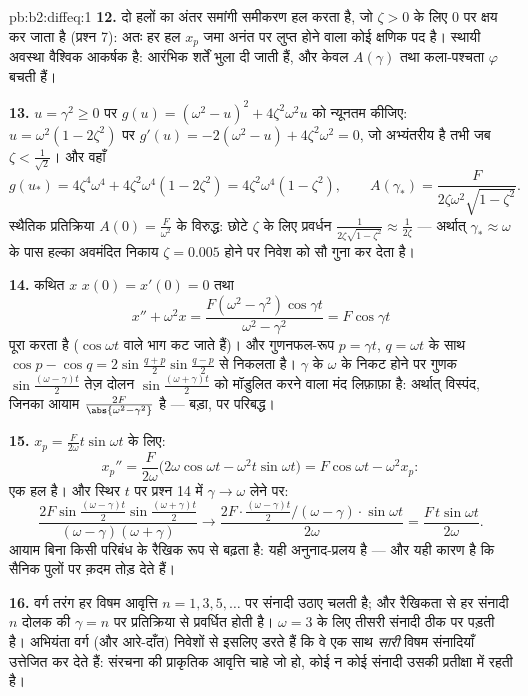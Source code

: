 \begin{solution}{pb:b2:diffeq:1}
\textbf{12.} दो हलों का अंतर समांगी समीकरण हल करता है, जो $\zeta > 0$ के लिए $0$
पर क्षय कर जाता है (प्रश्न 7): अतः हर हल $x_p$ जमा अनंत पर लुप्त होने वाला
कोई क्षणिक पद है। स्थायी अवस्था वैश्विक आकर्षक है: आरंभिक शर्तें भुला दी
जाती हैं, और केवल $A(\gamma)$ तथा कला-पश्चता $\varphi$ बचती हैं।

\textbf{13.} $u = \gamma^2 \geq 0$ पर $g(u) = (\omega^2 - u)^2 +
4\zeta^2\omega^2u$ को न्यूनतम कीजिए: $u = \omega^2(1 -
2\zeta^2)$ पर $g'(u) =
-2(\omega^2 - u) + 4\zeta^2\omega^2 = 0$, जो अभ्यंतरीय है तभी
जब $\zeta < \frac{1}{\sqrt2}$। और वहाँ
\[
g(u_*) = 4\zeta^4\omega^4 + 4\zeta^2\omega^4(1 - 2\zeta^2)
= 4\zeta^2\omega^4(1 - \zeta^2),
\qquad
A(\gamma_*) = \frac{F}{2\zeta\omega^2\sqrt{1 - \zeta^2}} .
\]
स्थैतिक प्रतिक्रिया $A(0) = \frac{F}{\omega^2}$ के विरुद्ध: छोटे $\zeta$ के लिए प्रवर्धन $\frac{1}{2\zeta\sqrt{1-\zeta^2}} \approx
\frac{1}{2\zeta}$ --- अर्थात्
$\gamma_* \approx \omega$ के पास हल्का अवमंदित निकाय $\zeta = 0.005$ होने पर निवेश को सौ गुना कर देता है।

\textbf{14.} कथित $x$ $x(0) = x'(0) = 0$ तथा
\[
x'' + \omega^2 x = \frac{F(\omega^2 -
\gamma^2)\cos\gamma t}{\omega^2 - \gamma^2} = F\cos\gamma t
\]
पूरा करता है ($\cos\omega t$ वाले भाग कट जाते हैं)। और गुणनफल-रूप $p = \gamma t$, $q = \omega t$ के साथ
$\cos p - \cos q = 2\sin\frac{q+p}{2}\sin\frac{q-p}2$ से निकलता है। $\gamma$ के $\omega$ के निकट होने पर गुणक $\sin\frac{(\omega-\gamma)t}2$ तेज़ दोलन $\sin\frac{(\omega+\gamma)t}2$ को
मॉडुलित करने वाला मंद लिफ़ाफ़ा है: अर्थात् विस्पंद, जिनका आयाम $\frac{2F}{\abs{\omega^2-\gamma^2}}$ है ---
बड़ा, पर परिबद्ध।

\textbf{15.} $x_p = \frac{F}{2\omega}t\sin\omega t$ के लिए:
\[
x_p'' = \frac{F}{2\omega}\bigl(2\omega\cos\omega t -
\omega^2t\sin\omega t\bigr)
= F\cos\omega t - \omega^2x_p :
\]
एक हल है। और स्थिर $t$ पर प्रश्न 14 में $\gamma \to \omega$ लेने पर:
\[
\frac{2F\sin\frac{(\omega-\gamma)t}2
\sin\frac{(\omega+\gamma)t}{2}}
{(\omega-\gamma)(\omega+\gamma)}
\longrightarrow
\frac{2F\cdot\frac{(\omega-\gamma)t}2\big/(\omega-\gamma)
\cdot\sin\omega t}{2\omega}
= \frac{F\,t\sin\omega t}{2\omega} .
\]
आयाम बिना किसी परिबंध के रैखिक रूप से बढ़ता है: यही अनुनाद-प्रलय है --- और
यही कारण है कि सैनिक पुलों पर क़दम तोड़ देते हैं।

\textbf{16.} वर्ग तरंग हर विषम आवृत्ति $n = 1, 3, 5, \dots$ पर संनादी उठाए चलती है; और
रैखिकता से हर संनादी $n$ दोलक की $\gamma = n$ पर प्रतिक्रिया से प्रवर्धित होती है।
$\omega = 3$ के लिए तीसरी संनादी ठीक  पर पड़ती है। अभियंता वर्ग (और आरे-दाँत)
निवेशों से इसलिए डरते हैं कि वे एक साथ \emph{सारी} विषम संनादियाँ उत्तेजित
कर देते हैं: संरचना की प्राकृतिक आवृत्ति चाहे जो हो, कोई न कोई संनादी उसकी
प्रतीक्षा में रहती है।


\end{solution}
